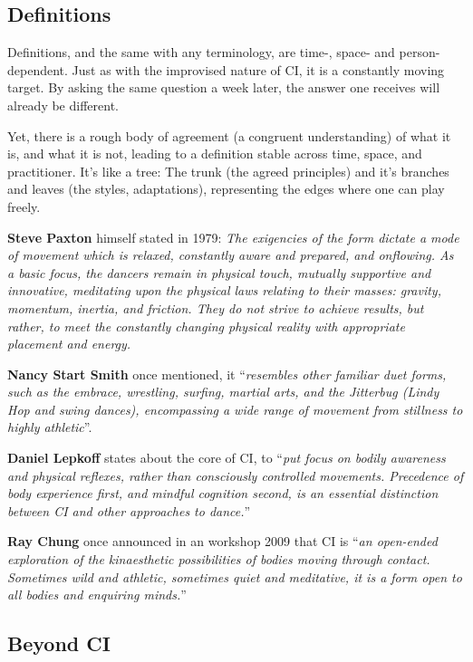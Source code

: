 \subsection{Definitions}\label{subsec:definitions}

Definitions, and the same with any terminology, are time-, space- and person-dependent.
Just as with the improvised nature of CI, it is a constantly moving target.
By asking the same question a week later, the answer one receives will already be different.

Yet, there is a rough body of agreement (a congruent understanding) of what it is, and what it is not, leading to a definition stable across time, space, and practitioner.
It's like a tree: The trunk (the agreed principles) and it's branches and leaves (the styles, adaptations), representing the edges where one can play freely.

\textbf{Steve Paxton} himself stated in 1979: \textit{The exigencies of the form dictate a mode of movement which is relaxed, constantly aware and prepared, and onflowing. As a basic focus, the dancers remain in physical touch, mutually supportive and innovative, meditating upon the physical laws relating to their masses: gravity, momentum, inertia, and friction. They do not strive to achieve results, but rather, to meet the constantly changing physical reality with appropriate placement and energy.}

\textbf{Nancy Start Smith} once mentioned, it ``\textit{resembles other familiar duet forms, such as the embrace, wrestling, surfing, martial arts, and the Jitterbug (Lindy Hop and swing dances), encompassing a wide range of movement from stillness to highly athletic}''.

\textbf{Daniel Lepkoff} states about the core of CI, to ``\textit{put focus on bodily awareness and physical reflexes, rather than consciously controlled movements. Precedence of body experience first, and mindful cognition second, is an essential distinction between CI and other approaches to dance.}''

\textbf{Ray Chung} once announced in an workshop 2009 that CI is ``\textit{an open-ended exploration of the kinaesthetic possibilities of bodies moving through contact. Sometimes wild and athletic, sometimes quiet and meditative, it is a form open to all bodies and enquiring minds.}''

\subsection{Beyond CI}\label{subsec:beyond-ci}

